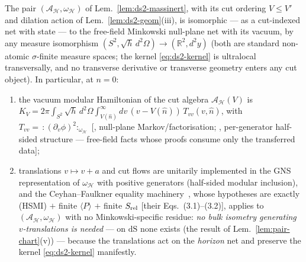\begin{lemma}
\label{lem:ds2-transfer}
The pair $(\mathcal A_{\mathcal H},\omega_{\mathcal H})$ of
Lem.~\ref{lem:ds2-massinert}, with its cut ordering $V\le V'$ and
dilation action of Lem.~\ref{lem:ds2-geom}(iii), is isomorphic ---
as a cut-indexed net with state --- to the free-field Minkowski
null-plane net with its vacuum, by any measure isomorphism
$(S^2,\sqrt h\,d^2\Omega)\to(\mathbb R^2,d^2y)$ (both are standard
non-atomic $\sigma$-finite measure spaces; the kernel
\eqref{eq:ds2-kernel} is ultralocal transversally, and no transverse
derivative or transverse geometry enters any cut object). In
particular, at $n=0$:
\begin{enumerate}
\item[(i)] the vacuum modular Hamiltonian of the cut algebra
  $\mathcal A_{\mathcal H}(V)$ is
  $K_V=2\pi\int_{S^2}\!\sqrt h\,d^2\Omega\int_{V(\hat
  n)}^{\infty}\!dv\,(v-V(\hat n))\,T_{vv}(v,\hat n)$, with
  $T_{vv}=\,:\!(\partial_v\phi)^2\!:_{\omega_{\mathcal H}}$
  [\cite{CasiniTesteTorroba2017}, null-plane Markov/factorisation;
  \cite{Wall2012}, per-generator half-sided structure --- free-field
  facts whose proofs consume only the transferred data];
\item[(ii)] translations $v\mapsto v+a$ and cut flows are unitarily
  implemented in the GNS representation of $\omega_{\mathcal H}$
  with positive generators (half-sided modular inclusion), and the
  Ceyhan--Faulkner equality machinery~\cite{CeyhanFaulkner2018},
  whose hypotheses are exactly (HSMI) $+$ finite $\langle
  P\rangle$ $+$ finite $S_{\rm rel}$ [their Eqs.~(3.1)--(3.2)],
  applies to $(\mathcal A_{\mathcal H},\omega_{\mathcal H})$ with no
  Minkowski-specific residue: \emph{no bulk isometry generating
  $v$-translations is needed} --- on $\mathrm{dS}$ none exists (the
  result of Lem.~\ref{lem:pair-chart}(v)) --- because the translations act on the
  \emph{horizon} net and preserve the kernel
  \eqref{eq:ds2-kernel} manifestly.
\end{enumerate}
\end{lemma}

